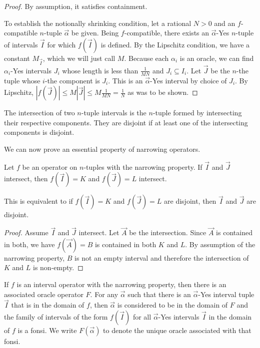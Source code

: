 \documentclass[12pt]{article}
\begin{document}
\begin{proof}
    By assumption, it satisfies containment. 

    To establish the notionally shrinking condition, let a rational $N >0$ and an $f$-compatible $n$-tuple $\vec{\alpha}$ be given. Being $f$-compatible, there exists an $\vec{\alpha}$-Yes $n$-tuple of intervals $\vec{I}$ for which $f(\vec{I})$ is defined. By the Lipschitz condition, we have a constant $M_{\vec{I}}$, which we will just call $M$. Because each $\alpha_i$ is an oracle, we can find $\alpha_i$-Yes intervals $J_i$ whose length is less than $\frac{1}{MN}$ and $J_i \subseteq I_i$. Let $\vec{J}$ be the $n$-the tuple whose $i$-the component is $J_i$. This is an $\vec{\alpha}$-Yes interval by choice of $J_i$. By Lipschitz, $|f(\vec{J})| \leq M |\vec{J}| \leq M \frac{1}{MN} = \frac{1}{N}$ as was to be shown. 
\end{proof}


The intersection of two $n$-tuple intervals is the $n$-tuple formed by intersecting their respective components. They are disjoint if at least one of the intersecting components is disjoint. 

We can now prove an essential property of narrowing operators. 

\begin{proposition} \label{pr:op-nrw}
Let $f$ be an operator on $n$-tuples with the narrowing property. If $\vec{I}$ and $\vec{J}$ intersect, then $f(\vec{I})=K$ and $f(\vec{J}) = L$ intersect.
\end{proposition}

This is equivalent to if $f(\vec{I})=K$ and $f(\vec{J}) = L$ are disjoint, then $\vec{I}$ and $\vec{J}$ are disjoint.

\begin{proof}
Assume $\vec{I}$ and $\vec{J}$ intersect. Let $\vec{A}$ be the intersection. Since $\vec{A}$ is contained in both, we have $f(\vec A)= B$ is contained in both $K$ and $L$. By assumption of the narrowing property, $B$ is not an empty interval and therefore the intersection of $K$ and $L$ is non-empty. 
\end{proof}


\begin{theorem}\label{th:intop}
If $f$ is an interval operator with the narrowing property, then there is an associated oracle operator $F$. For any $\vec{\alpha}$ such that there is an $\vec{\alpha}$-Yes interval tuple $\vec{I}$ that is in the domain of 
$f$, then $\vec{\alpha}$ is considered to be in the domain of $F$ and the family of intervals of the form $f(\vec{I})$ for all $\vec{\alpha}$-Yes intervals $\vec{I}$ in the domain of $f$ is a fonsi. We write $F(\vec{\alpha})$ to denote the unique oracle associated with that fonsi. 
\end{theorem}
\end{document}
